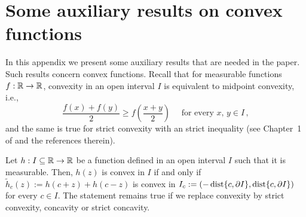 \section{Some auxiliary results on convex functions}
\label{Sec:AuxiliaryResults}

In this appendix we present some auxiliary results that are needed in the paper. Such results concern convex functions. Recall that for measurable functions $f:\mathbb{R}\to \mathbb{R}$, convexity in an open interval $I$ is equivalent to midpoint convexity, i.e.,
$$
\dfrac{f(x) + f(y)}{2} \geq f \left( \dfrac{x+y}{2}\right) \quad \textrm{ for every } x,\, y \in I\,,
$$
and the same is true for strict convexity with an strict inequality
(see Chapter~1 of \cite{Niculescu} and the references therein).


\begin{lemma}
\label{Lemma:Convex<->AllReflectionsConvex} Let $h: I \subseteq \mathbb{R} \to \mathbb{R}$ be a function defined in
an open interval $I$ such that it is measurable. Then, $h(z)$ is convex in $I$ if and only if
$\widetilde{h}_c(z) := h(c+z) + h(c-z)$ is convex in $I_c := (-\operatorname{dist}\{c, \partial I\}, \operatorname{dist}\{c,
\partial I\})$ for every $c\in I$. The statement remains true if we replace convexity by strict
convexity, concavity or strict concavity.
\end{lemma}

